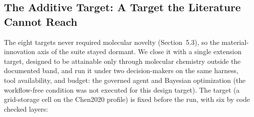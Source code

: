 \subsection{The Additive Target: A Target the Literature Cannot Reach}
\label{sec:forcing}

The eight targets never required molecular novelty (Section~5.3), so
the material-innovation axis of the suite stayed dormant. We close it
with a single extension target, designed to be attainable only through
molecular chemistry outside the documented band, and run it under two
decision-makers on the same harness, tool availability, and budget: the
governed agent and Bayesian optimization (the workflow-free condition was
not executed for this design target). The
target (a grid-storage cell on the Chen2020 profile) is fixed before
the run, with six by code checked layers:

